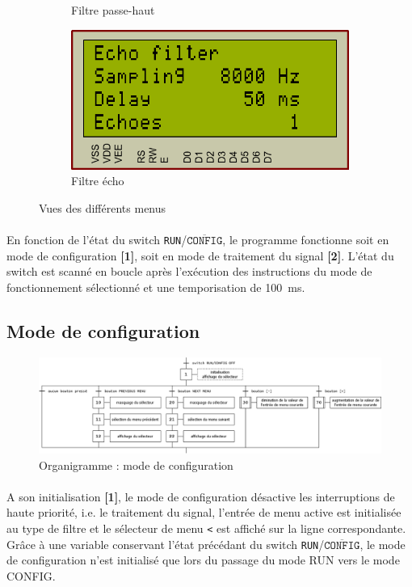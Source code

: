 \documentclass{article}
\begin{document}
\begin{figure}[H]
\begin{subfigure}[b]{0.34\textwidth}
            \caption{Filtre passe-haut}
        \end{subfigure}
        \begin{subfigure}[b]{0.34\textwidth}
            \centering
            \includegraphics[width=.9\textwidth]{./images/vue_echo.png}
            \caption{Filtre écho}
        \end{subfigure}
        \caption{Vues des différents menus}
   \end{figure}

    \paragraph{}
    En fonction de l'état du switch \texttt{RUN}/$\overline{\texttt{CONFIG}}$, le programme fonctionne soit en mode de configuration \textbf{[1]}, soit en mode de traitement du signal \textbf{[2]}. L'état du switch est scanné en boucle après l'exécution des instructions du mode de fonctionnement sélectionné et une temporisation de \SI{100}{\milli\second}.

    \subsection{Mode de configuration}
    \begin{figure}[H]
        \centering
        \includegraphics[width=\textwidth]{./images/orga_config.png}
        \caption{Organigramme : mode de configuration}
    \end{figure}

    \paragraph{}
    A son initialisation \textbf{[1]}, le mode de configuration désactive les interruptions de haute priorité, i.e. le traitement du signal, l'entrée de menu active est initialisée au type de filtre et le sélecteur de menu \texttt{<} est affiché sur la ligne correspondante. Grâce à une variable conservant l'état précédant du switch \texttt{RUN}/$\overline{\texttt{CONFIG}}$, le mode de configuration n'est initialisé que lors du passage du mode RUN vers le mode CONFIG.
\end{document}
